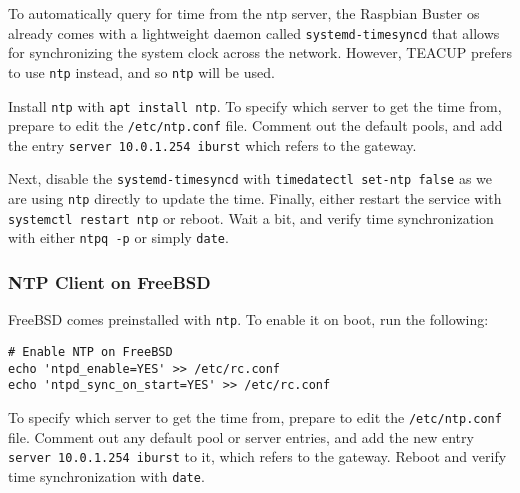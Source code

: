 To automatically query for time from the \gls{ntp} server, the Raspbian Buster \gls{os} already comes with a lightweight daemon called \lstinline{systemd-timesyncd} that allows for synchronizing the system clock across the network. However, TEACUP prefers to use \lstinline{ntp} instead, and so \lstinline{ntp} will be used.

Install \lstinline{ntp} with \lstinline{apt install ntp}. To specify which server to get the time from, prepare to edit the \lstinline{/etc/ntp.conf} file. Comment out the default pools, and add the entry \lstinline{server 10.0.1.254 iburst} which refers to the gateway.

Next, disable the \lstinline{systemd-timesyncd} with \lstinline{timedatectl set-ntp false} as we are using \lstinline{ntp} directly to update the time. Finally, either restart the service with \lstinline{systemctl restart ntp} or reboot. Wait a bit, and verify time synchronization with either \lstinline{ntpq -p} or simply \lstinline{date}.

\subsubsection{NTP Client on FreeBSD}

FreeBSD comes preinstalled with \lstinline{ntp}. To enable it on boot, run the following:

\begin{verbatim}
# Enable NTP on FreeBSD
echo 'ntpd_enable=YES' >> /etc/rc.conf
echo 'ntpd_sync_on_start=YES' >> /etc/rc.conf
\end{verbatim}

To specify which server to get the time from, prepare to edit the \lstinline{/etc/ntp.conf} file. Comment out any default pool or server entries, and add the new entry \lstinline{server 10.0.1.254 iburst} to it, which refers to the gateway. Reboot and verify time synchronization with \lstinline{date}.
